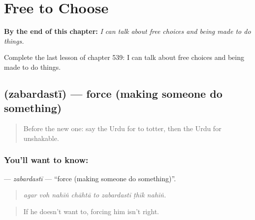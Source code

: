 
\chapter{Free to Choose}
\label{ch:ur-free-to-choose}

\begin{chapteropening}
\textbf{By the end of this chapter:} \emph{I can talk about free choices and being made to do things.}

Complete the last lesson of chapter 539: I can talk about free choices and being made to do things.
\end{chapteropening}

\section[\texorpdfstring{\ur{زبردستی} (zabardastī)}{زبردستی (zabardastī)}]{ (zabardastī) — force (making someone do something)}

\label{lesson:UR-C539-zabardasti}



\begin{quote}
Before the new one: say the Urdu for to totter, then the Urdu for unshakable.
\end{quote}

\subsection*{You'll want to know: }
\textbf{} — \emph{zabardastī} — \textquotedblleft{}force (making someone do something)\textquotedblright{}.

\begin{quote}
       
\end{quote}

\begin{quote}
\emph{agar voh nahīṅ chāhtā to zabardastī ṭhīk nahīṅ.}
\end{quote}

\begin{quote}
If he doesn't want to, forcing him isn't right.
\end{quote}

